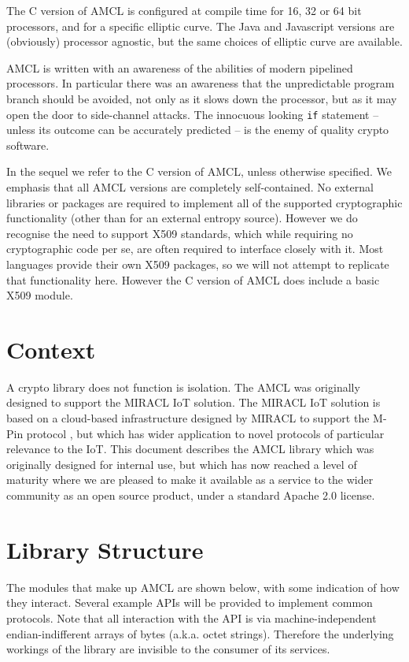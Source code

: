 \documentclass{llncs}
\begin{document}
The C version of AMCL is configured at compile time for 16, 32 or 64 bit processors, and for a specific elliptic curve. The Java and Javascript versions are (obviously) processor agnostic, 
but the same choices of elliptic curve are available.

AMCL is written with an awareness of the abilities of modern pipelined processors. In particular there was an awareness that the unpredictable program branch should be avoided, not 
only as it slows down the processor, but as it may open the door to side-channel attacks. The innocuous looking {\tt if} statement -- unless its outcome can be accurately predicted -- is the enemy 
of quality crypto software.

In the sequel we refer to the C version of AMCL, unless otherwise specified. We emphasis that all AMCL versions are completely self-contained. No external 
libraries or packages are required to implement all of the supported cryptographic functionality (other than for an external entropy source). However we do recognise the need to
support X509 standards, which while requiring no cryptographic code per se, are often required to interface closely with it. Most languages provide their own X509 packages, so we will not
attempt to replicate that functionality here. However the C version of AMCL does include a basic X509 module.

\section{Context}

A crypto library does not function is isolation. The AMCL was originally designed to support the MIRACL IoT solution. The MIRACL IoT solution is based on a cloud-based infrastructure designed by MIRACL 
to support the M-Pin protocol \cite{mpin}, but which has wider application to novel protocols of particular relevance to the IoT. This document describes the AMCL library which was originally designed for internal use, 
but which has now reached a level of maturity where we are pleased to make it available as a service to the wider community as an open source product, under a standard Apache 2.0 license.

\section{Library Structure}

The modules that make up AMCL are shown below, with some indication of how they interact. Several example APIs will be provided to implement common protocols. Note that all
interaction with the API is via machine-independent endian-indifferent arrays of bytes (a.k.a. octet strings). 
Therefore the underlying workings of the library are invisible to the consumer of its services.
\end{document}
